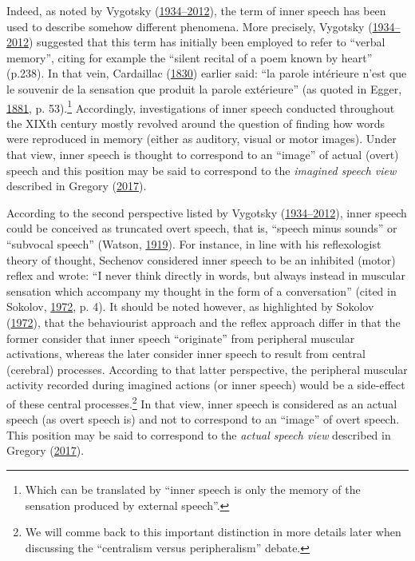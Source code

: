 \documentclass[a4paper,12pt,twoside,onecolumn,openright,final,oldfontcommands]{memoir}
\let\rmarkdownfootnote\footnote%
\def\footnote{\protect\rmarkdownfootnote}
\begin{document}
Indeed, as noted by Vygotsky (\protect\hyperlink{ref-vygotsky_thought_1934}{1934--2012}), the term of inner speech has been used to describe somehow different phenomena. More precisely, Vygotsky (\protect\hyperlink{ref-vygotsky_thought_1934}{1934--2012}) suggested that this term has initially been employed to refer to \enquote{verbal memory}, citing for example the \enquote{silent recital of a poem known by heart} (p.238). In that vein, Cardaillac (\protect\hyperlink{ref-cardaillac_etudes_1830}{1830}) earlier said: \enquote{la parole intérieure n'est que le souvenir de la sensation que produit la parole extérieure} (as quoted in Egger, \protect\hyperlink{ref-egger_parole_1881}{1881}, p. 53).\footnote{Which can be translated by \enquote{inner speech is only the memory of the sensation produced by external speech}.} Accordingly, investigations of inner speech conducted throughout the XIXth century mostly revolved around the question of finding how words were reproduced in memory (either as auditory, visual or motor images). Under that view, inner speech is thought to correspond to an \enquote{image} of actual (overt) speech and this position may be said to correspond to the \emph{imagined speech view} described in Gregory (\protect\hyperlink{ref-gregory_inner_2017}{2017}).

According to the second perspective listed by Vygotsky (\protect\hyperlink{ref-vygotsky_thought_1934}{1934--2012}), inner speech could be conceived as truncated overt speech, that is, \enquote{speech minus sounds} or \enquote{subvocal speech} (Watson, \protect\hyperlink{ref-watson_psychology_1919}{1919}). For instance, in line with his reflexologist theory of thought, Sechenov considered inner speech to be an inhibited (motor) reflex and wrote: \enquote{I never think directly in words, but always instead in muscular sensation which accompany my thought in the form of a conversation} (cited in Sokolov, \protect\hyperlink{ref-sokolov_inner_1972}{1972}, p. 4). It should be noted however, as highlighted by Sokolov (\protect\hyperlink{ref-sokolov_inner_1972}{1972}), that the behaviourist approach and the reflex approach differ in that the former consider that inner speech \enquote{originate} from peripheral muscular activations, whereas the later consider inner speech to result from central (cerebral) processes. According to that latter perspective, the peripheral muscular activity recorded during imagined actions (or inner speech) would be a side-effect of these central processes.\footnote{We will comme back to this important distinction in more details later when discussing the \enquote{centralism versus peripheralism} debate.} In that view, inner speech is considered as an actual speech (as overt speech is) and not to correspond to an \enquote{image} of overt speech. This position may be said to correspond to the \emph{actual speech view} described in Gregory (\protect\hyperlink{ref-gregory_inner_2017}{2017}).
\end{document}
